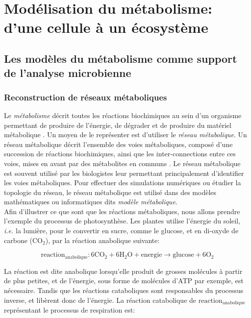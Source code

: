 \documentclass[../main.tex]{subfiles}
\begin{document}
\chapter{Modélisation du métabolisme: d'une cellule à un écosystème}
\minitoc
\label{ch:edla}

\newpage

\section{Les modèles du métabolisme comme support de l'analyse microbienne}

\subsection{Reconstruction de réseaux métaboliques}
Le \textit{métabolisme} décrit toutes les réactions biochimiques au sein d'un organisme permettant de produire de l'énergie, de dégrader et de produire du matériel métabolique \citep{Nava2023}. Un moyen de le représenter est d'utiliser le \textit{réseau métabolique}. Un réseau métabolique décrit l'ensemble des voies métaboliques, composé d'une succession de réactions biochimiques, ainsi que les inter-connections entre ces voies, mises en avant par des métabolites en communs \citep{Goldford2018}. Le réseau métabolique est souvent utilisé par les biologistes leur permettant principalement d'identifier les voies métaboliques. Pour effectuer des simulations numériques ou étudier la topologie du réseau, le réseau métabolique est utilisé dans des modèles mathématiques ou informatiques dits \textit{modèle métabolique}.\\

Afin d'illustrer ce que sont que les réactions métaboliques, nous allons prendre l'exemple du processus de photosynthèse. Les plantes utilise l'énergie du soleil, \textit{i.e.} la lumière, pour le convertir en sucre, comme le glucose, et en di-oxyde de carbone ($\text{CO}_2$), par la réaction anabolique suivante:

\[
\text{reaction}_\text{anabolique} : 6\text{CO}_2 + 6\text{H}_2\text{O} + \text{energie} \rightarrow \text{glucose} + 6\text{O}_2
\]

La réaction est dite anabolique lorsqu'elle produit de grosses molécules à partir de plus petites, et de l'énergie, sous forme de molécules d'ATP par exemple, est nécessaire. Tandis que les réactions cataboliques sont responsables du processus inverse, et libèrent donc de l'énergie. La réaction catabolique de $\text{reaction}_\text{anabolique}$ représentant le processus de respiration est:
\end{document}
